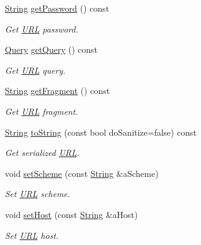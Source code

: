 \begin{DoxyCompactItemize}
\hyperlink{namespaceostk_1_1io_a95d49b120613a7610cb1b4f03b1116b6}{String} \hyperlink{classostk_1_1io_1_1_u_r_l_aa0a33984e00c87fa1f9c405bffea4c56}{get\+Password} () const
\begin{DoxyCompactList}\small\item\em Get \hyperlink{classostk_1_1io_1_1_u_r_l}{U\+RL} password. \end{DoxyCompactList}\item 
\hyperlink{namespaceostk_1_1io_aeabc644ba5c25896df8014bd0271f970}{Query} \hyperlink{classostk_1_1io_1_1_u_r_l_ac6ddb4ae26ba6f2cd61f3c94483d7b0f}{get\+Query} () const
\begin{DoxyCompactList}\small\item\em Get \hyperlink{classostk_1_1io_1_1_u_r_l}{U\+RL} query. \end{DoxyCompactList}\item 
\hyperlink{namespaceostk_1_1io_a95d49b120613a7610cb1b4f03b1116b6}{String} \hyperlink{classostk_1_1io_1_1_u_r_l_ab4f89a76481899ca2ef35915cf5460b6}{get\+Fragment} () const
\begin{DoxyCompactList}\small\item\em Get \hyperlink{classostk_1_1io_1_1_u_r_l}{U\+RL} fragment. \end{DoxyCompactList}\item 
\hyperlink{namespaceostk_1_1io_a95d49b120613a7610cb1b4f03b1116b6}{String} \hyperlink{classostk_1_1io_1_1_u_r_l_af1b7bd5cffeda8dcbf7e469f68bc8f0f}{to\+String} (const bool do\+Sanitize=false) const
\begin{DoxyCompactList}\small\item\em Get serialized \hyperlink{classostk_1_1io_1_1_u_r_l}{U\+RL}. \end{DoxyCompactList}\item 
void \hyperlink{classostk_1_1io_1_1_u_r_l_ac758bfb15653ebfcc7b4f1fee145024b}{set\+Scheme} (const \hyperlink{namespaceostk_1_1io_a95d49b120613a7610cb1b4f03b1116b6}{String} \&a\+Scheme)
\begin{DoxyCompactList}\small\item\em Set \hyperlink{classostk_1_1io_1_1_u_r_l}{U\+RL} scheme. \end{DoxyCompactList}\item 
void \hyperlink{classostk_1_1io_1_1_u_r_l_accdfb1800b5e0d89e85bc27d302004a7}{set\+Host} (const \hyperlink{namespaceostk_1_1io_a95d49b120613a7610cb1b4f03b1116b6}{String} \&a\+Host)
\begin{DoxyCompactList}\small\item\em Set \hyperlink{classostk_1_1io_1_1_u_r_l}{U\+RL} host. \end{DoxyCompactList}\item 

\end{DoxyCompactItemize}
